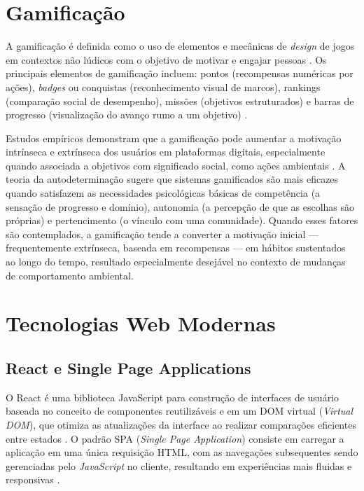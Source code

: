 \documentclass[
	12pt,
	openright,
	oneside,
	a4paper,
	chapter=TITLE,
	section=TITLE,
	subsection=TITLE,
	subsubsection=TITLE,
	english,
	brazil
	]{abntex2}
\begin{document}
\section{Gamificação}

A gamificação é definida como o uso de elementos e mecânicas de \textit{design} de jogos em contextos não lúdicos com o objetivo de motivar e engajar pessoas \cite{DETERDING2011}. Os principais elementos de gamificação incluem: pontos (recompensas numéricas por ações), \textit{badges} ou conquistas (reconhecimento visual de marcos), rankings (comparação social de desempenho), missões (objetivos estruturados) e barras de progresso (visualização do avanço rumo a um objetivo) \cite{HAMARI2014}.

Estudos empíricos demonstram que a gamificação pode aumentar a motivação intrínseca e extrínseca dos usuários em plataformas digitais, especialmente quando associada a objetivos com significado social, como ações ambientais \cite{JOHNSON2016}. A teoria da autodeterminação \cite{RYAN2000} sugere que sistemas gamificados são mais eficazes quando satisfazem as necessidades psicológicas básicas de competência (a sensação de progresso e domínio), autonomia (a percepção de que as escolhas são próprias) e pertencimento (o vínculo com uma comunidade). Quando esses fatores são contemplados, a gamificação tende a converter a motivação inicial — frequentemente extrínseca, baseada em recompensas — em hábitos sustentados ao longo do tempo, resultado especialmente desejável no contexto de mudanças de comportamento ambiental.

\section{Tecnologias Web Modernas}

\subsection{React e Single Page Applications}

O React é uma biblioteca JavaScript para construção de interfaces de usuário baseada no conceito de componentes reutilizáveis e em um DOM virtual (\textit{Virtual DOM}), que otimiza as atualizações da interface ao realizar comparações eficientes entre estados \cite{REACTDOCS2024}. O padrão SPA (\textit{Single Page Application}) consiste em carregar a aplicação em uma única requisição HTML, com as navegações subsequentes sendo gerenciadas pelo \textit{JavaScript} no cliente, resultando em experiências mais fluidas e responsivas \cite{FLANAGAN2020}.
\end{document}
